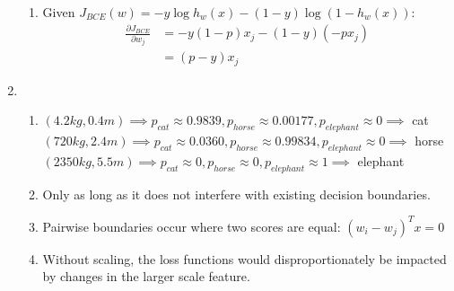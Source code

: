 \documentclass[12pt, a4paper]{article}
\begin{document}
\begin{enumerate}[\Alph*.]
\begin{enumerate}[\arabic*.]
      \item Given $J_{BCE}(w) = -y\log h_w(x) - (1-y)\log (1-h_w(x))$:
        \begin{align*}
          \frac{\partial J_{BCE}}{\partial w_j} &= -y(1-p)x_j - (1-y)(-px_j)\\
                                                &= (p-y)x_j
        \end{align*}
    \end{enumerate}

  \item 
    \begin{enumerate}[\arabic*.]
      \item $(4.2kg, 0.4m) \implies p_{cat} \approx 0.9839, p_{horse} \approx 0.00177, p_{elephant} \approx 0 \implies$ cat\\
        $(720kg, 2.4m) \implies p_{cat} \approx 0.0360, p_{horse} \approx 0.99834, p_{elephant} \approx 0 \implies$ horse\\
        $(2350kg, 5.5m) \implies p_{cat} \approx 0, p_{horse} \approx 0, p_{elephant} \approx 1 \implies$ elephant

      \item Only as long as it does not interfere with existing decision boundaries.

      \item Pairwise boundaries occur where two scores are equal: $(w_i - w_j)^Tx = 0$  

      \item Without scaling, the loss functions would disproportionately be impacted by changes in the larger scale feature.
    \end{enumerate}

\end{enumerate}
\end{document}
